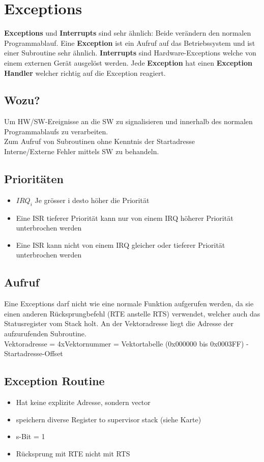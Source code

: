\section{Exceptions}
\textbf{Exceptions} und \textbf{Interrupts} sind sehr ähnlich: Beide verändern den normalen Programmablauf.
Eine \textbf{Exception} ist ein Aufruf auf das Betriebssystem und ist einer Subroutine sehr ähnlich. 
\textbf{Interrupts} sind Hardware-Exceptions welche von einem externen Gerät ausgelöst werden.
Jede \textbf{Exception} hat einen \textbf{Exception Handler} welcher richtig auf die Exception reagiert.
\subsection{Wozu?}
Um HW/SW-Ereignisse an die SW zu signalisieren und innerhalb des normalen
Programmablaufs zu verarbeiten.\\
Zum Aufruf von Subroutinen ohne Kenntnis der Startadresse\\
Interne/Externe Fehler mittels SW zu behandeln.\\
\subsection{Prioritäten}
\begin{itemize}
	\item $IRQ_i$ Je grösser i desto höher die Priorität
	\item Eine ISR tieferer Priorität kann nur von einem IRQ höherer Priorität unterbrochen werden
	\item Eine ISR kann nicht von einem IRQ gleicher oder tieferer Priorität unterbrochen werden
\end{itemize}
\subsection{Aufruf}
Eine Exceptions darf nicht wie eine normale Funktion aufgerufen werden, da sie einen anderen Rücksprungbefehl (RTE anstelle RTS) verwendet, welcher auch das Statusregister vom Stack holt.
An der Vektoradresse liegt die Adresse der aufzurufenden Subroutine.\\
Vektoradresse = 4xVektornummer = Vektortabelle (0x000000 bis 0x0003FF)
-Startadresse-Offset\\
\subsection{Exception Routine}
\begin{itemize}
  \item Hat keine explizite Adresse, sondern vector
  \item speichern diverse Register to supervisor stack (siehe Karte)
  \item s-Bit = 1
  \item Rücksprung mit RTE nicht mit RTS
\end{itemize}

